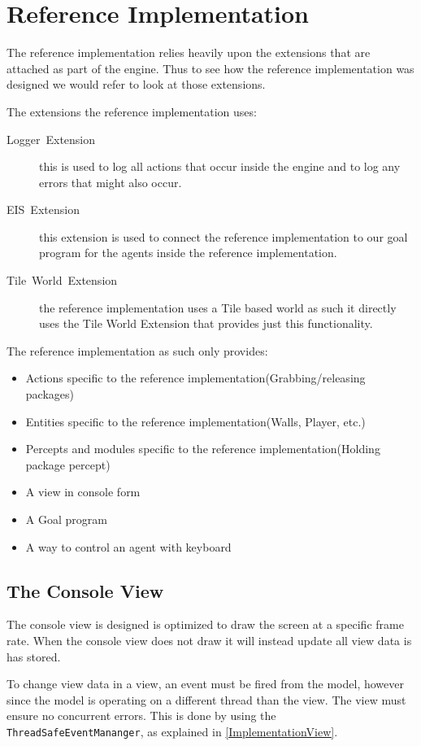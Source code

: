 
\section{Reference Implementation}

The reference implementation relies heavily upon the extensions that
are attached as part of the engine. Thus to see how the reference
implementation was designed we would refer to look at those extensions.

The extensions the reference implementation uses:
\begin{description}
\item [{Logger~Extension}] this is used to log all actions that occur
inside the engine and to log any errors that might also occur.
\item [{EIS~Extension}] this extension is used to connect the reference
implementation to our goal program for the agents inside the reference
implementation.
\item [{Tile~World~Extension}] the reference implementation uses a Tile
based world as such it directly uses the Tile World Extension that
provides just this functionality.
\end{description}
The reference implementation as such only provides:
\begin{itemize}
\item Actions specific to the reference implementation(Grabbing/releasing
packages)
\item Entities specific to the reference implementation(Walls, Player, etc.)
\item Percepts and modules specific to the reference implementation(Holding
package percept)
\item A view in console form
\item A Goal program
\item A way to control an agent with keyboard
\end{itemize}

\subsection{The Console View}

The console view is designed is optimized to draw the screen at a
specific frame rate. When the console view does not draw it will instead
update all view data is has stored.

To change view data in a view, an event must be fired from the model,
however since the model is operating on a different thread than the
view. The view must ensure no concurrent errors. This is done by using
the \texttt{ThreadSafeEventMananger}, as explained in \ref{ImplementationView}.

